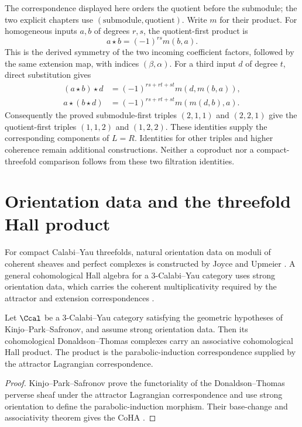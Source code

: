 The correspondence displayed here orders the quotient before the
submodule; the two explicit chapters use $(\text{submodule},\text{quotient})$.
Write $m$ for their product. For homogeneous inputs $a,b$ of degrees $r,s$,
the quotient-first product is
\[
 a\star b=(-1)^{rs}m(b,a).
\]
This is the derived symmetry of the two incoming coefficient factors,
followed by the same extension map, with indices $(\beta,\alpha)$.
For a third input $d$ of degree $t$, direct substitution gives
\[
 \begin{aligned}
 (a\star b)\star d
 &=(-1)^{rs+rt+st}m(d,m(b,a)),\\
 a\star(b\star d)
 &=(-1)^{rs+rt+st}m(m(d,b),a).
 \end{aligned}
\]
Consequently the proved submodule-first triples $(2,1,1)$ and $(2,2,1)$
give the quotient-first triples $(1,1,2)$ and $(1,2,2)$.
These identities supply the corresponding components of $L=R$.
Identities for other triples and higher coherence remain additional
constructions. Neither a coproduct nor a compact-threefold comparison
follows from these two filtration identities.

\chapter{Orientation data and the threefold Hall product}
For compact Calabi--Yau threefolds, natural orientation data on moduli of coherent sheaves and perfect complexes is constructed by Joyce and Upmeier \cite{JoyceUpmeier}.  A general cohomological Hall algebra for a $3$-Calabi--Yau category uses strong orientation data, which carries the coherent multiplicativity required by the attractor and extension correspondences \cite{KPS}.

\begin{theorem}
Let $\Ccal$ be a $3$-Calabi--Yau category satisfying the geometric hypotheses of Kinjo--Park--Safronov, and assume strong orientation data.  Then its cohomological Donaldson--Thomas complexes carry an associative cohomological Hall product.  The product is the parabolic-induction correspondence supplied by the attractor Lagrangian correspondence.
\end{theorem}
\begin{proof}
Kinjo--Park--Safronov prove the functoriality of the Donaldson--Thomas perverse sheaf under the attractor Lagrangian correspondence and use strong orientation to define the parabolic-induction morphism.  Their base-change and associativity theorem gives the CoHA \cite{KPS}.
\end{proof}

